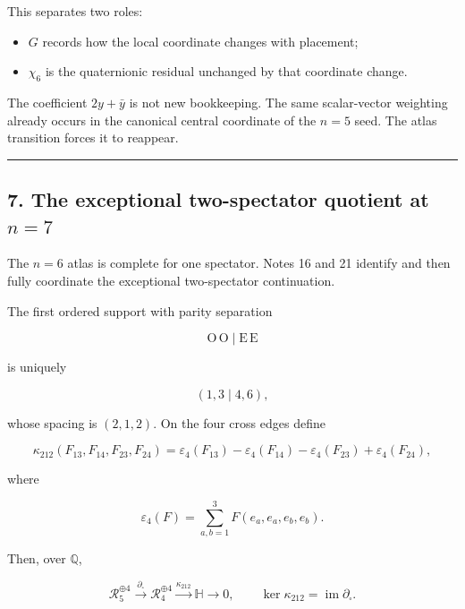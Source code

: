 \documentclass[
  11pt,
  a4paper,
]{article}
\providecommand{\tightlist}{%
  \setlength{\itemsep}{0pt}\setlength{\parskip}{0pt}}
\begin{document}
This separates two roles:

\begin{itemize}
\tightlist
\item
  \(G\) records how the local coordinate changes with placement;
\item
  \(\chi_6\) is the quaternionic residual unchanged by that coordinate
  change.
\end{itemize}

The coefficient \(2y+\bar y\) is not new bookkeeping. The same
scalar-vector weighting already occurs in the canonical central
coordinate of the \(n=5\) seed. The atlas transition forces it to
reappear.

\begin{center}\rule{0.5\linewidth}{0.5pt}\end{center}

\hypertarget{the-exceptional-two-spectator-quotient-at-n7}{%
\subsection{\texorpdfstring{7. The exceptional two-spectator quotient at
\(n=7\)}{7. The exceptional two-spectator quotient at n=7}}\label{the-exceptional-two-spectator-quotient-at-n7}}

The \(n=6\) atlas is complete for one spectator. Notes 16 and 21
identify and then fully coordinate the exceptional two-spectator
continuation.

The first ordered support with parity separation

\[
\mathrm O\,\mathrm O\mid\mathrm E\,\mathrm E
\tag{7.1}
\]

is uniquely

\[
\boxed{(1,3\mid4,6),}
\tag{7.2}
\]

whose spacing is \((2,1,2)\). On the four cross edges define

\[
\kappa_{212}
(F_{13},F_{14},F_{23},F_{24})
=
\varepsilon_4(F_{13})
-\varepsilon_4(F_{14})
-\varepsilon_4(F_{23})
+\varepsilon_4(F_{24}),
\tag{7.3}
\]

where

\[
\varepsilon_4(F)
=
\sum_{a,b=1}^{3}F(e_a,e_a,e_b,e_b).
\tag{7.4}
\]

Then, over \(\mathbb Q\),

\[
\boxed{
\mathcal R_5^{\oplus4}
\xrightarrow{\partial_\square}
\mathcal R_4^{\oplus4}
\xrightarrow{\kappa_{212}}
\mathbb H
\longrightarrow0,
\qquad
\ker\kappa_{212}=\operatorname{im}\partial_\square.
}
\tag{7.5}
\]
\end{document}
